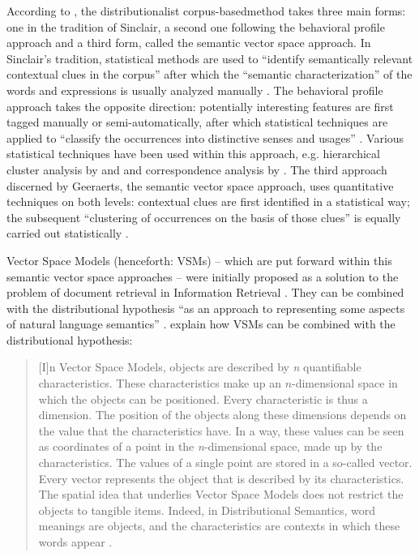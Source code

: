 According to \citet[242--243]{riemer_sense_2016}, the distributionalist corpus-based\linebreak method takes three main forms: one in the tradition of Sinclair, a second one following the behavioral profile approach and a third form, called the semantic vector space approach. In Sinclair’s tradition, statistical methods are used to “identify semantically relevant contextual clues in the corpus” \citep[242]{riemer_sense_2016} after which the “semantic characterization” of the words and expressions is usually analyzed manually \citep[242]{riemer_sense_2016}. The behavioral profile approach takes the opposite direction: potentially interesting features are first tagged manually or semi-automatically, after which statistical techniques are applied to “classify the occurrences into distinctive senses and usages” \citep[243]{riemer_sense_2016}. Various statistical techniques have been used within this approach, e.g. hierarchical cluster analysis by \citet{gries_corpus-based_2006} and \citet{divjak_structuring_2010} and correspondence analysis by \citet{glynn_empirical_2010} \citep[243]{riemer_sense_2016}. The third approach discerned by Geeraerts, the semantic vector space approach, uses quantitative techniques on both levels: contextual clues are first identified in a statistical way; the subsequent “clustering of occurrences on the basis of those clues” is equally carried out statistically \citep[243]{riemer_sense_2016}.

Vector Space Models (henceforth: VSMs) – which are put forward within this semantic vector space approaches – were initially proposed as a solution to the problem of document retrieval in Information Retrieval \citep[495]{lappin_vector_2015}. They can be combined with the distributional hypothesis “as an approach to representing some aspects of natural language semantics” \citep[141]{turney_frequency_2010}. \citet[212]{szmrecsanyi_semantic_2014} explain how VSMs can be combined with the distributional hypothesis:

\begin{quote}
[I]n Vector Space Models, objects are described by \textit{n} quantifiable characteristics. These characteristics make up an $n$-dimensional space in which the objects can be positioned. Every characteristic is thus a dimension. The position of the objects along these dimensions depends on the value that the characteristics have. In a way, these values can be seen as coordinates of a point in the \textit{n}{}-dimensional space, made up by the characteristics. The values of a single point are stored in a so-called vector. Every vector represents the object that is described by its characteristics. The spatial idea that underlies Vector Space Models does not restrict the objects to tangible items. Indeed, in Distributional Semantics, word meanings are objects, and the characteristics are contexts in which these words appear \citep[212]{szmrecsanyi_semantic_2014}.
\end{quote}

